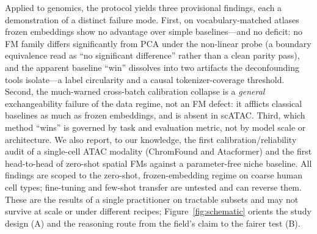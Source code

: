 \documentclass[11pt]{article}
\begin{document}
Applied to genomics, the protocol yields three provisional findings, each a demonstration of a distinct failure mode. First, on vocabulary-matched atlases frozen embeddings show no advantage over simple baselines---and no deficit: no FM family differs significantly from PCA under the non-linear probe (a boundary equivalence read as ``no significant difference'' rather than a clean parity pass), and the apparent baseline ``win'' dissolves into two artifacts the deconfounding tools isolate---a label circularity and a causal tokenizer-coverage threshold. Second, the much-warned cross-batch calibration collapse is a \emph{general} exchangeability failure of the data regime, not an FM defect: it afflicts classical baselines as much as frozen embeddings, and is absent in scATAC. Third, which method ``wins'' is governed by task and evaluation metric, not by model scale or architecture. We also report, to our knowledge, the first calibration/reliability audit of a single-cell ATAC modality (ChromFound and Atacformer) and the first head-to-head of zero-shot spatial FMs against a parameter-free niche baseline. All findings are scoped to the zero-shot, frozen-embedding regime on coarse human cell types; fine-tuning and few-shot transfer are untested and can reverse them. These are the results of a single practitioner on tractable subsets and may not survive at scale or under different recipes; Figure~\ref{fig:schematic} orients the study design (A) and the reasoning route from the field's claim to the fairer test (B).
\end{document}
